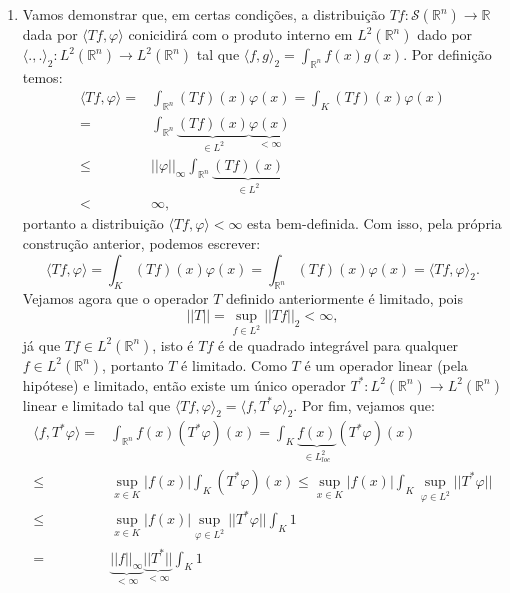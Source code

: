\documentclass{article}
\begin{document}
\begin{enumerate}
\begin{enumerate}
				\item Vamos demonstrar que, em certas condições, a distribuição $Tf: \mathcal{S}(\mathbb{R}^{n}) \to \mathbb{R}$ dada por $\langle Tf, \varphi \rangle$ conicidirá com o produto interno em $L^{2}(\mathbb{R}^{n})$ dado por $\langle .,.\rangle_{2} : L^{2}(\mathbb{R}^{n}) \to L^{2}(\mathbb{R}^{n})$ tal que $\langle f, g \rangle_{2} = \int_{\mathbb{R}^{n}} f(x)g(x)$. Por definição temos:
				$$
				\begin{aligned}
				\langle Tf, \varphi \rangle = & \int_{\mathbb{R}^{n}} (Tf)(x)\varphi(x) = \int_{K} (Tf)(x)\varphi(x)
				\\
				= & \int_{\mathbb{R}^{n}} \underbrace{ (Tf)(x) }_{\in L^{2}} \underbrace{ \varphi(x) }_{<\infty} 
				\\
				\leq & ||\varphi||_{\infty} \int_{\mathbb{R}^{n}} \underbrace{ (Tf)(x) }_{\in L^{2}}
				\\
				< & \infty,
				\end{aligned}
				$$
				portanto  a distribuição $\langle Tf, \varphi \rangle < \infty$ esta bem-definida. Com isso, pela própria construção anterior, podemos escrever:
				$$
				\langle Tf, \varphi \rangle = \int_{K} (Tf)(x)\varphi(x) = \int_{\mathbb{R}^{n}} (Tf)(x)\varphi(x)  = \langle Tf, \varphi \rangle_{2}.
				$$
				Vejamos agora que o operador $T$ definido anteriormente é limitado, pois 
				$$
				||T|| = \sup_{f \in L^{2}}||Tf||_{2} < \infty,
				$$
				já que $Tf \in L^{2}(\mathbb{R}^{n})$, isto é $Tf$ é de quadrado integrável para qualquer $f \in L^{2}(\mathbb{R}^{n})$, portanto $T$ é limitado.  Como $T$ é um operador linear (pela hipótese) e limitado, então existe um único operador $T^{*} : L^{2}(\mathbb{R}^{n}) \to L^{2}(\mathbb{R}^{n})$ linear e limitado tal que $\langle Tf, \varphi \rangle_{2} = \langle f, T^{*}\varphi \rangle_{2}$. Por fim, vejamos que:
				$$
				\begin{aligned}
				\langle f, T^{*}\varphi \rangle = & \int_{\mathbb{R}^{n}} f(x)(T^{*}\varphi)(x) = \int_{K} \underbrace{ f(x) }_{\in L^{2}_{loc}} (T^{*}\varphi)(x)
				\\
				\leq & \sup_{x \in K}|f(x)| \int_{K} (T^{*}\varphi)(x) 	\leq \sup_{x \in K}|f(x)| \int_{K} \sup_{\varphi \in L^{2}} ||T^{*}\varphi||
				\\
				\leq & \sup_{x \in K}|f(x)| \sup_{\varphi \in L^{2}} ||T^{*}\varphi|| \int_{K} 1 
				\\
				= & \underbrace{ ||f||_{\infty} }_{<\infty} \underbrace{ ||T^{*}|| }_{< \infty} \int_{K} 1 
				\\

\end{aligned}$$
\end{enumerate}
\end{enumerate}
\end{document}
